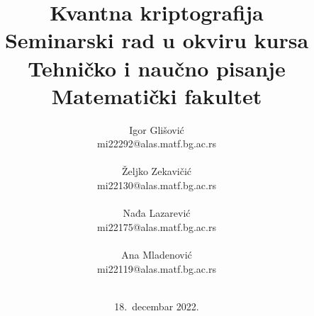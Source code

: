 \documentclass[a4paper]{article}
\begin{document}
\title{Kvantna kriptografija\\ \small{Seminarski rad u okviru kursa\\Tehničko i naučno pisanje\\ Matematički fakultet}}

\author{Igor Glišović\\mi22292@alas.matf.bg.ac.rs\\\\ Željko Zekavičić\\mi22130@alas.matf.bg.ac.rs\\\\ Nađa Lazarević\\mi22175@alas.matf.bg.ac.rs\\\\ Ana Mladenović\\mi22119@alas.matf.bg.ac.rs\\\\}
\date{18.~decembar 2022.}
\maketitle
\end{document}
